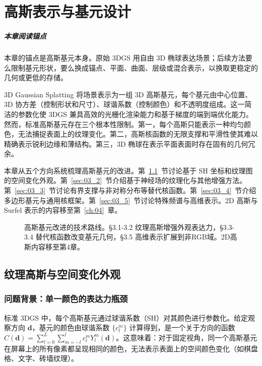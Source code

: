 \chapter{高斯表示与基元设计}
\label{ch:03}

\paragraph*{本章阅读锚点}
本章的锚点是高斯基元本身。原始 3DGS 用自由 3D 椭球表达场景；后续方法要么限制基元形状，要么换成锚点、平面、曲面、层级或混合表示，以换取更稳定的几何或更低的存储。


3D Gaussian Splatting 将场景表示为一组 3D 高斯基元，每个基元由中心位置、3D 协方差（控制形状和尺寸）、球谐系数（控制颜色）和不透明度组成。这一简洁的参数化使 3DGS 兼具高效的光栅化渲染能力和基于梯度的端到端优化能力。然而，标准高斯基元存在三个根本性限制。第一，每个高斯只能表示一种均匀颜色，无法捕捉表面上的纹理变化。第二，高斯核函数的无限支撑和平滑性使其难以精确表示锐利边缘和薄结构。第三，3D 椭球在表示平面表面时存在固有的几何冗余。

本章从五个方向系统梳理高斯基元的改进。第~\ref{sec:03_1}~节讨论基于 SH 坐标和纹理图的空间变化外观。第~\ref{sec:03_2}~节介绍基于神经场的纹理化与其他增强方法。第~\ref{sec:03_3}~节讨论有界支撑与非对称分布等替代核函数。第~\ref{sec:03_4}~节介绍多边形基元与通用核框架。第~\ref{sec:03_5}~节讨论特殊频谱与高维表示。2D 高斯与 Surfel 表示的内容移至第~\ref{ch:04}~章。

\begin{figure}[htbp]
\centering
\resizebox{0.95\textwidth}{!}{}
\caption{高斯基元改进的技术路线。§3.1-3.2 纹理高斯增强外观表达力，§3.3-3.4 替代核函数改变基元几何，§3.5 高维表示扩展到非RGB域。2D高斯内容移至第4章。}
\label{fig:03_taxonomy}
\end{figure}


\section{纹理高斯与空间变化外观}
\label{sec:03_1}

\subsection{问题背景：单一颜色的表达力瓶颈}

标准 3DGS 中，每个高斯基元通过球谐系数（SH）对其颜色进行参数化。给定观察方向 $\mathbf{d}$，基元的颜色由球谐系数 $\{c_l^m\}$ 计算得到，是一个关于方向的函数 $C(\mathbf{d}) = \sum_{l=0}^{L} \sum_{m=-l}^{l} c_l^m Y_l^m(\mathbf{d})$。这意味着：对于固定视角，同一个高斯基元在屏幕上的所有像素都呈现相同的颜色，无法表示表面上的空间颜色变化（如棋盘格、文字、砖墙纹理）。

